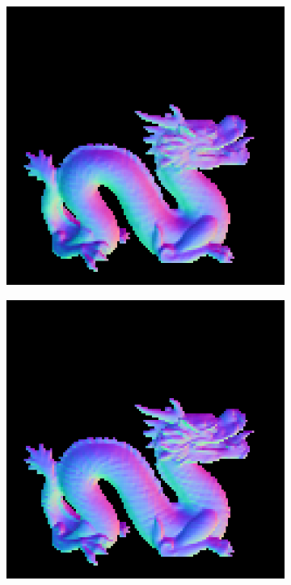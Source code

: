 \begin{figure}
\begin{subfigure}[b]{0.18\linewidth}
	\end{subfigure}
	\begin{subfigure}[b]{0.18\linewidth}
		\includegraphics[width=\linewidth]{./Figures/gcnn_synthetic/fancy_eval_7_normal_f2.png}
	\end{subfigure}
	\begin{subfigure}[b]{0.18\linewidth}
		\includegraphics[width=\linewidth]{./Figures/gcnn_synthetic/fancy_eval_7_normal_f3.png}

\end{subfigure}
\end{figure}
